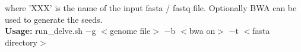 \documentclass[11pt,a4paper,oneside]{book}
\begin{document}
where 'XXX' is the name of the input fasta / fastq file. Optionally BWA can be used to generate the seeds.\\


{\bf Usage:} run\_delve.sh  $-$g $<$genome file$>$ $-$b $<$bwa on$>$ $-$t $<$fasta directory$>$\\



  


 
%

\end{document}
